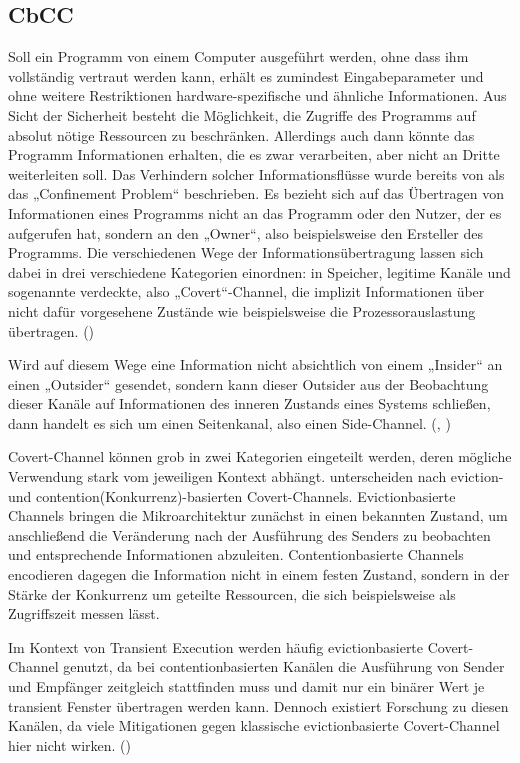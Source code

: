 
\subsection{\acf{CbCC}}
Soll ein Programm von einem Computer ausgeführt werden,
ohne dass ihm vollständig vertraut werden kann,
erhält es zumindest Eingabeparameter
und ohne weitere Restriktionen hardware-spezifische und
ähnliche Informationen. Aus Sicht der Sicherheit besteht die
Möglichkeit, die Zugriffe des Programms auf absolut nötige
Ressourcen zu beschränken. Allerdings auch dann könnte das
Programm Informationen erhalten, die es zwar verarbeiten,
aber nicht an Dritte weiterleiten soll. Das Verhindern solcher
Informationsflüsse wurde bereits von \cite{lampson_note_1973}
als das „Confinement Problem“ beschrieben. Es bezieht sich auf
das Übertragen von Informationen eines Programms nicht an das
Programm oder den Nutzer, der es aufgerufen hat, sondern an den
„Owner“, also beispielsweise den Ersteller des Programms.
Die verschiedenen Wege der Informationsübertragung lassen sich
dabei in drei verschiedene Kategorien einordnen: in
Speicher, legitime Kanäle und sogenannte verdeckte, also
„Covert“-Channel, die implizit Informationen über nicht dafür
vorgesehene Zustände wie beispielsweise die Prozessorauslastung
übertragen. (\cite[613,614]{lampson_note_1973})

Wird auf diesem Wege eine Information nicht absichtlich von einem
„Insider“ an einen „Outsider“ gesendet, sondern kann dieser
Outsider aus der Beobachtung dieser Kanäle auf Informationen des
inneren Zustands eines Systems schließen, dann handelt es sich
um einen Seitenkanal, also einen Side-Channel.
(\cite[1]{almgren_c5_2015}, \cite[1]{wang_covert_2006})

Covert-Channel können grob in zwei Kategorien eingeteilt werden,
deren mögliche Verwendung stark vom jeweiligen Kontext abhängt.
\cite[3]{paccagnella_lord_2021} unterscheiden nach
eviction- und contention(Konkurrenz)-basierten Covert-Channels.
Evictionbasierte Channels bringen die Mikroarchitektur zunächst
in einen bekannten Zustand, um anschließend die Veränderung nach
der Ausführung des Senders zu beobachten und entsprechende
Informationen abzuleiten. Contentionbasierte Channels
encodieren dagegen die Information nicht in einem festen Zustand,
sondern in der Stärke der Konkurrenz um geteilte Ressourcen, die
sich beispielsweise als Zugriffszeit messen lässt.

Im Kontext von Transient Execution werden häufig
evictionbasierte Covert-Channel genutzt, da bei contentionbasierten 
Kanälen die Ausführung von Sender und Empfänger zeitgleich
stattfinden muss und damit nur ein binärer Wert je transient
Fenster übertragen werden kann. Dennoch existiert Forschung zu
diesen Kanälen, da viele Mitigationen gegen
klassische evictionbasierte Covert-Channel hier nicht wirken.
(\cite[8]{fustos_spectrerewind_2020})

